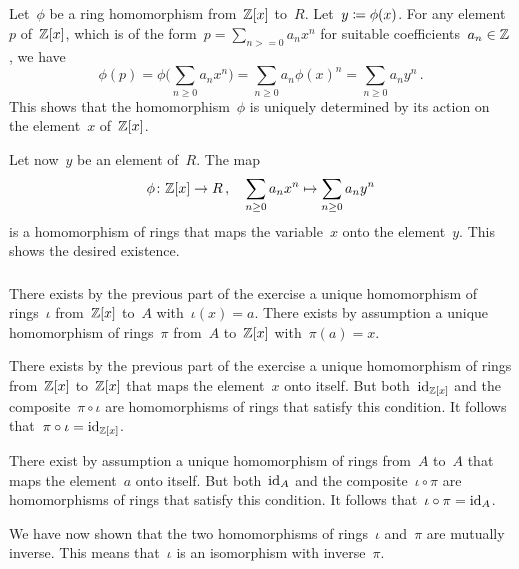 \subsection{}



\subsubsection{}

Let~$\phi$ be a ring homomorphism from~$\mathbb{Z}[x]$ to~$R$.
Let~$y \coloneqq \phi(x)$.
For any element~$p$ of~$\mathbb{Z}[x]$, which is of the form~$p = \sum_{n >= 0} a_n x^n$ for suitable coefficients~$a_n \in \mathbb{Z}$, we have
\[
	\phi(p)
	=
	\phi\Biggl( \sum_{n \geq 0} a_n x^n \Biggr)
	=
	\sum_{n \geq 0} a_n \phi(x)^n
	=
	\sum_{n \geq 0} a_n y^n \,.
\]
This shows that the homomorphism~$\phi$ is uniquely determined by its action on the element~$x$ of~$\mathbb{Z}[x]$.

Let now~$y$ be an element of~$R$.
The map
\[
	\phi
	\colon
	\mathbb{Z}[x]
	\to
	R \,,
	\quad
	\sum_{n \geq 0} a_n x^n
	\mapsto
	\sum_{n \geq 0} a_n y^n
\]
is a homomorphism of rings that maps the variable~$x$ onto the element~$y$.
This shows the desired existence.



\subsubsection{}

There exists by the previous part of the exercise a unique homomorphism of rings~$\iota$ from~$\mathbb{Z}[x]$ to~$A$ with~$\iota(x) = a$.
There exists by assumption a unique homomorphism of rings~$\pi$ from~$A$ to~$\mathbb{Z}[x]$ with~$\pi(a) = x$.

There exists by the previous part of the exercise a unique homomorphism of rings from~$\mathbb{Z}[x]$ to~$\mathbb{Z}[x]$ that maps the element~$x$ onto itself.
But both~$\mathrm{id}_{\mathbb{Z}[x]}$ and the composite~$\pi \circ \iota$ are homomorphisms of rings that satisfy this condition.
It follows that~$\pi \circ \iota = \mathrm{id}_{\mathbb{Z}[x]}$.

There exist by assumption a unique homomorphism of rings from~$A$ to~$A$ that maps the element~$a$ onto itself.
But both~$\mathrm{id}_A$ and the composite~$\iota \circ \pi$ are homomorphisms of rings that satisfy this condition.
It follows that~$\iota \circ \pi = \mathrm{id}_A$.

We have now shown that the two homomorphisms of rings~$\iota$ and~$\pi$ are mutually inverse.
This means that~$\iota$ is an isomorphism with inverse~$\pi$.


